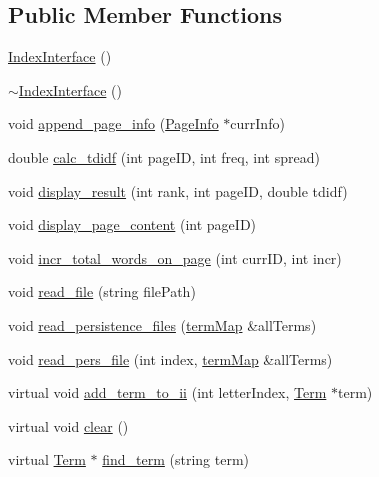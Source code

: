 \subsection*{Public Member Functions}
\begin{DoxyCompactItemize}
\item 
\hyperlink{class_index_interface_a7b1e7eae7faa652d2f63efeecf0ca2de}{Index\+Interface} ()
\item 
\hyperlink{class_index_interface_a3927fabe77a7da5845dc0495b2c1c2b2}{$\sim$\+Index\+Interface} ()
\item 
void \hyperlink{class_index_interface_a7f082789ce91eaaacc10a5c841b62cd4}{append\+\_\+page\+\_\+info} (\hyperlink{class_page_info}{Page\+Info} $\ast$curr\+Info)
\item 
double \hyperlink{class_index_interface_a8195aee88cd593c2e6ca2e2c48cbd068}{calc\+\_\+tdidf} (int page\+I\+D, int freq, int spread)
\item 
void \hyperlink{class_index_interface_a7e4d5fe8c31cfc9aa02c2dd1d7e1d3aa}{display\+\_\+result} (int rank, int page\+I\+D, double tdidf)
\item 
void \hyperlink{class_index_interface_a3d784385e028557312ef15d59574f9ed}{display\+\_\+page\+\_\+content} (int page\+I\+D)
\item 
void \hyperlink{class_index_interface_a5734b1488a787d47984bf97ffa5aff8d}{incr\+\_\+total\+\_\+words\+\_\+on\+\_\+page} (int curr\+I\+D, int incr)
\item 
void \hyperlink{class_index_interface_a229f1eb93f38d85d78e64e579c46c98a}{read\+\_\+file} (string file\+Path)
\item 
void \hyperlink{class_index_interface_aa6ef58f8b651083175b684b9428a90c5}{read\+\_\+persistence\+\_\+files} (\hyperlink{docparser_8h_a9b942645c404d380838be4078b0199d9}{term\+Map} \&all\+Terms)
\item 
void \hyperlink{class_index_interface_adcba07c90cd34ab0ce7bee340d09ed07}{read\+\_\+pers\+\_\+file} (int index, \hyperlink{docparser_8h_a9b942645c404d380838be4078b0199d9}{term\+Map} \&all\+Terms)
\item 
virtual void \hyperlink{class_index_interface_aa83b7083d107869e3519c5862bc71d0a}{add\+\_\+term\+\_\+to\+\_\+ii} (int letter\+Index, \hyperlink{class_term}{Term} $\ast$term)
\item 
virtual void \hyperlink{class_index_interface_ad7b88501f360ccfad0c1ee08d793ca25}{clear} ()
\item 
virtual \hyperlink{class_term}{Term} $\ast$ \hyperlink{class_index_interface_a851f0396f0b390cc9aa8cde270afffc9}{find\+\_\+term} (string term)

\end{DoxyCompactItemize}
